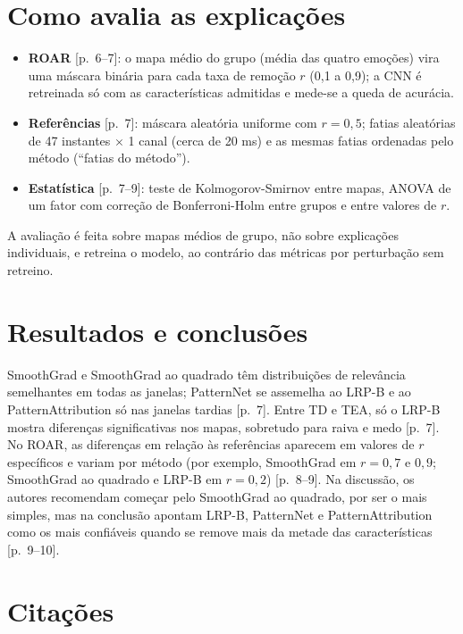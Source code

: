 \documentclass[11pt,a4paper]{article}
\begin{document}
\section{Como avalia as explicações}
\begin{itemize}
\item \textbf{ROAR} [p.~6--7]: o mapa médio do grupo (média das quatro emoções) vira uma máscara binária para cada taxa de remoção $r$ (0,1 a 0,9); a CNN é retreinada só com as características admitidas e mede-se a queda de acurácia.
\item \textbf{Referências} [p.~7]: máscara aleatória uniforme com $r=0{,}5$; fatias aleatórias de 47 instantes $\times$ 1 canal (cerca de 20 ms) e as mesmas fatias ordenadas pelo método (``fatias do método'').
\item \textbf{Estatística} [p.~7--9]: teste de Kolmogorov-Smirnov entre mapas, ANOVA de um fator com correção de Bonferroni-Holm entre grupos e entre valores de $r$.
\end{itemize}
A avaliação é feita sobre mapas médios de grupo, não sobre explicações individuais, e retreina o modelo, ao contrário das métricas por perturbação sem retreino.

\section{Resultados e conclusões}
SmoothGrad e SmoothGrad ao quadrado têm distribuições de relevância semelhantes em todas as janelas; PatternNet se assemelha ao LRP-B e ao PatternAttribution só nas janelas tardias [p.~7]. Entre TD e TEA, só o LRP-B mostra diferenças significativas nos mapas, sobretudo para raiva e medo [p.~7]. No ROAR, as diferenças em relação às referências aparecem em valores de $r$ específicos e variam por método (por exemplo, SmoothGrad em $r=0{,}7$ e $0{,}9$; SmoothGrad ao quadrado e LRP-B em $r=0{,}2$) [p.~8--9]. Na discussão, os autores recomendam começar pelo SmoothGrad ao quadrado, por ser o mais simples, mas na conclusão apontam LRP-B, PatternNet e PatternAttribution como os mais confiáveis quando se remove mais da metade das características [p.~9--10].

\section{Citações}
\end{document}
